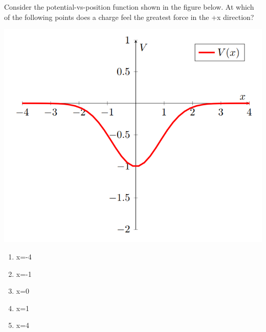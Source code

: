 \begin{question}
Consider the potential-vs-position function shown in the figure below. At which of the following points does a charge feel the greatest force in the +x direction?

\begin{center}

\includegraphics[scale=0.8]{Figures/Figure23}
\end{center}
\begin{multicols}{5}
\begin{enumerate}[label=(\alph*)]
    \item x=-4
    \item x=-1
    \item x=0
    \item x=1
    \item x=4
\end{enumerate}
\end{multicols}
\end{question}

